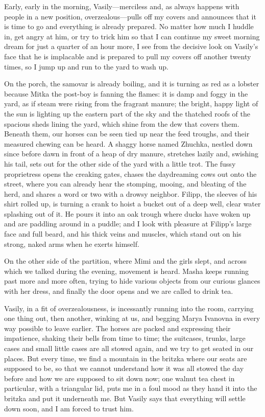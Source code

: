 Early, early in the morning, Vasily---merciless and, as always happens with people in a new position, overzealous---pulls off my covers and announces that it is time to go and everything is already prepared. No matter how much I huddle in, get angry at him, or try to trick him so that I can continue my sweet morning dream for just a quarter of an hour more, I see from the decisive look on Vasily's face that he is implacable and is prepared to pull my covers off another twenty times, so I jump up and run to the yard to wash up.

On the porch, the samovar is already boiling, and it is turning as red as a lobster because Mitka the post-boy is fanning the flames: it is damp and foggy in the yard, as if steam were rising from the fragrant manure; the bright, happy light of the sun is lighting up the eastern part of the sky and the thatched roofs of the spacious sheds lining the yard, which shine from the dew that covers them. Beneath them, our horses can be seen tied up near the feed troughs, and their measured chewing can be heard. A shaggy horse named Zhuchka, nestled down since before dawn in front of a heap of dry manure, stretches lazily and, swishing his tail, sets out for the other side of the yard with a little trot. The fussy proprietress opens the creaking gates, chases the daydreaming cows out onto the street, where you can already hear the stomping, mooing, and bleating of the herd, and shares a word or two with a drowsy neighbor. Filipp, the sleeves of his shirt rolled up, is turning a crank to hoist a bucket out of a deep well, clear water splashing out of it. He pours it into an oak trough where ducks have woken up and are paddling around in a puddle; and I look with pleasure at Filipp's large face and full beard, and his thick veins and muscles, which stand out on his strong, naked arms when he exerts himself.

On the other side of the partition, where Mimi and the girls slept, and across which we talked during the evening, movement is heard. Masha keeps running past more and more often, trying to hide various objects from our curious glances with her dress, and finally the door opens and we are called to drink tea.

Vasily, in a fit of overzealousness, is incessantly running into the room, carrying one thing out, then another, winking at us, and begging Marya Ivanovna in every way possible to leave earlier. The horses are packed and expressing their impatience, shaking their bells from time to time; the suitcases, trunks, large cases and small little cases are all stowed again, and we try to get seated in our places. But every time, we find a mountain in the britzka where our seats are supposed to be, so that we cannot understand how it was all stowed the day before and how we are supposed to sit down now; one walnut tea chest in particular, with a triangular lid, puts me in a foul mood as they hand it into the britzka and put it underneath me. But Vasily says that everything will settle down soon, and I am forced to trust him.

